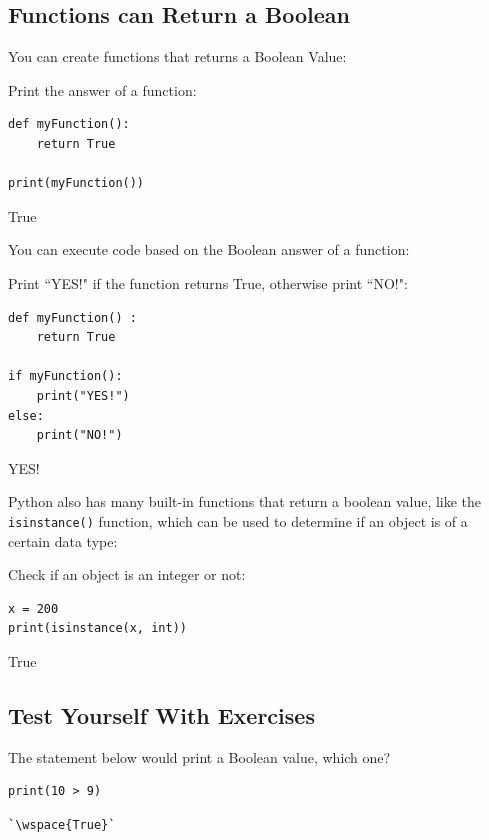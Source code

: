 \documentclass[12pt,a4paper]{article}
\newcommand{\wspace}[1]{%
	\color{white}\colorbox{white}{\texttt{#1}}%
}
\newcommand{\code}[1]{%
	\colorbox{backcolour}{\lstinline{#1}}%
}
\begin{document}
\subsection{Functions can Return a Boolean}

You can create functions that returns a Boolean Value:

\begin{ebox}
Print the answer of a function:
	\begin{lstlisting}
def myFunction():
    return True

print(myFunction())
	\end{lstlisting}
\tcblower
	\begin{vercode}
True
	\end{vercode}
\end{ebox}

You can execute code based on the Boolean answer of a function:

\begin{ebox}
Print ``YES!" if the function returns True, otherwise print ``NO!":
	\begin{lstlisting}
def myFunction() :
    return True

if myFunction():
    print("YES!")
else:
    print("NO!")
	\end{lstlisting}
\tcblower
	\begin{vercode}
YES!
	\end{vercode}
\end{ebox}

Python also has many built-in functions that return a boolean value, like the
\code{isinstance()} function, which can be used to determine if an object is of a
certain data type:

\begin{ebox}
Check if an object is an integer or not:
	\begin{lstlisting}
x = 200
print(isinstance(x, int))
	\end{lstlisting}
\tcblower
	\begin{vercode}
True
	\end{vercode}
\end{ebox}
\subsection{Test Yourself With Exercises}
\begin{tbox}
The statement below would print a Boolean value, which one?
	\begin{lstlisting}[numbers=none]
print(10 > 9)
	\end{lstlisting}
\tcblower
	\begin{lstlisting}[numbers=none]
`\wspace{True}`
	\end{lstlisting}
\end{tbox}
\vfill\newpage
\end{document}
